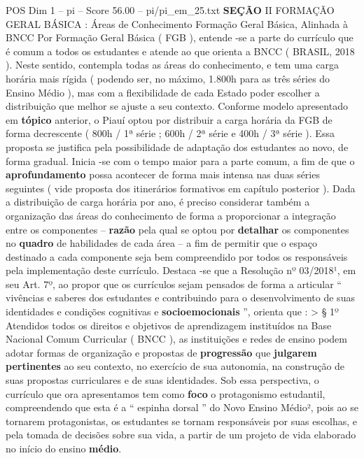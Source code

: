 \begin{textsample}{POS Dim 1 – pi – Score 56.00 – pi/pi\_em\_25.txt}  \label{ex:f1_pos_058}
\textbf{SEÇÃO} II FORMAÇÃO GERAL BÁSICA : Áreas de Conhecimento Formação Geral Básica, Alinhada à BNCC Por Formação Geral Básica ( FGB ), entende -se a parte do currículo que é comum a todos os estudantes e atende ao que orienta a BNCC ( BRASIL, 2018 ).
Neste sentido, contempla todas as áreas do conhecimento, e tem uma carga horária mais rígida ( podendo ser, no máximo, 1.800h para as três séries do Ensino Médio ), mas com a flexibilidade de cada Estado poder escolher a distribuição que melhor se ajuste a seu contexto.
Conforme modelo apresentado em \textbf{tópico} anterior, o Piauí optou por distribuir a carga horária da FGB de forma decrescente ( 800h / 1ª série ; 600h / 2ª série e 400h / 3ª série ).
Essa proposta se justifica pela possibilidade de adaptação dos estudantes ao novo, de forma gradual.
Inicia -se com o tempo maior para a parte comum, a fim de que o \textbf{aprofundamento} possa acontecer de forma mais intensa nas duas séries seguintes ( vide proposta dos itinerários formativos em capítulo posterior ).
Dada a distribuição de carga horária por ano, é preciso considerar também a organização das áreas do conhecimento de forma a proporcionar a integração entre os componentes – \textbf{razão} pela qual se optou por \textbf{detalhar} os componentes no \textbf{quadro} de habilidades de cada área – a fim de permitir que o espaço destinado a cada componente seja bem compreendido por todos os responsáveis pela implementação deste currículo.
Destaca -se que a Resolução nº 03/2018¹, em seu Art. 7º, ao propor que os currículos sejam pensados de forma a articular “ vivências e saberes dos estudantes e contribuindo para o desenvolvimento de suas identidades e condições cognitivas e \textbf{socioemocionais} ”, orienta que : > § 1º Atendidos todos os direitos e objetivos de aprendizagem instituídos na Base Nacional Comum Curricular ( BNCC ), as instituições e redes de ensino podem adotar formas de organização e propostas de \textbf{progressão} que \textbf{julgarem} \textbf{pertinentes} ao seu contexto, no exercício de sua autonomia, na construção de suas propostas curriculares e de suas identidades.
Sob essa perspectiva, o currículo que ora apresentamos tem como \textbf{foco} o protagonismo estudantil, compreendendo que esta é a “ espinha dorsal ” do Novo Ensino Médio², pois ao se tornarem protagonistas, os estudantes se tornam responsáveis por suas escolhas, e pela tomada de decisões sobre sua vida, a partir de um projeto de vida elaborado no início do ensino \textbf{médio}.

\end{textsample}
